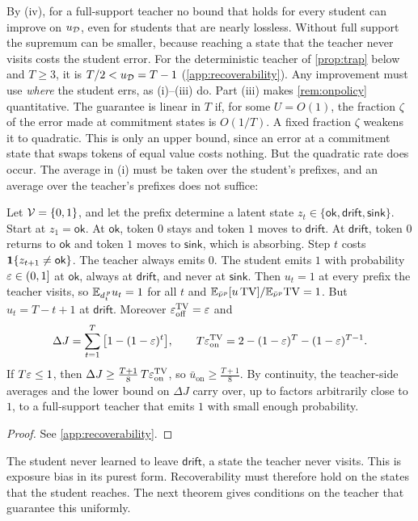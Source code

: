 \noindent
By (iv), for a full-support teacher no bound that holds for every student can improve on $u_{\mathcal{D}}$, even for
students that are nearly lossless. Without full support the supremum can be smaller, because reaching a
state that the teacher never visits costs the student error. For the deterministic teacher of
\cref{prop:trap} below and $T\ge3$, it is $T/2<u_{\mathcal{D}}=T-1$ (\cref{app:recoverability}). Any improvement must use
\emph{where} the student errs, as (i)--(iii) do. Part (iii) makes \cref{rem:onpolicy} quantitative. The guarantee is
linear in $T$ if, for some $U=O(1)$, the fraction $\zeta$ of the error made at commitment states is $O(1/T)$. A fixed
fraction $\zeta$ weakens it to quadratic. This is only an upper bound, since an error at a commitment state that
swaps tokens of equal value costs nothing. But the quadratic rate does occur. The average in (i) must be
taken over the student's prefixes, and an average over the teacher's prefixes does not suffice:

\begin{proposition}\label{prop:trap}
\Pv\Ck Let $\mathcal{V}=\{0,1\}$, and let the prefix determine a latent state $z_t\in\{\mathsf{ok},\mathsf{drift},\mathsf{sink}\}$. Start at
$z_1=\mathsf{ok}$. At $\mathsf{ok}$, token $0$ stays and token $1$ moves to $\mathsf{drift}$. At $\mathsf{drift}$, token $0$ returns to $\mathsf{ok}$
and token $1$ moves to $\mathsf{sink}$, which is absorbing. Step $t$ costs $\mathbf{1}\{z_{t+1}\ne\mathsf{ok}\}$. The teacher always
emits $0$. The student emits $1$ with probability $\varepsilon\in(0,1]$ at $\mathsf{ok}$, always at $\mathsf{drift}$, and never at $\mathsf{sink}$.
Then $u_t=1$ at every prefix the teacher visits, so $\mathbb{E}_{d^{\,p}_{t}}u_t=1$ for all $t$ and $\mathbb{E}_{\bar\nu^p}[u\,\mathrm{TV}]/\mathbb{E}_{\bar\nu^p}\mathrm{TV}=1$. But
$u_t=T-t+1$ at $\mathsf{drift}$. Moreover $\varepsilon_{\mathrm{off}}^{\mathrm{TV}}=\varepsilon$ and
\[
\Delta J=\sum_{t=1}^T\big[1-(1-\varepsilon)^t\big],\qquad T\varepsilon_{\mathrm{on}}^{\mathrm{TV}}=2-(1-\varepsilon)^T-(1-\varepsilon)^{T-1}.
\]
If $T\varepsilon\le1$, then $\Delta J\ge\frac{T+1}8\,T\varepsilon_{\mathrm{on}}^{\mathrm{TV}}$, so $\bar u_{\mathrm{on}}\ge\frac{T+1}8$. By continuity, the teacher-side averages and
the lower bound on $\Delta J$ carry over, up to factors arbitrarily close to $1$, to a full-support teacher that
emits $1$ with small enough probability.
\end{proposition}
\begin{proof}
See \cref{app:recoverability}.
\end{proof}

\noindent
The student never learned to leave $\mathsf{drift}$, a state the teacher never visits. This is exposure bias in its
purest form. Recoverability must therefore hold on the states that the student reaches. The next theorem
gives conditions on the teacher that guarantee this uniformly.

